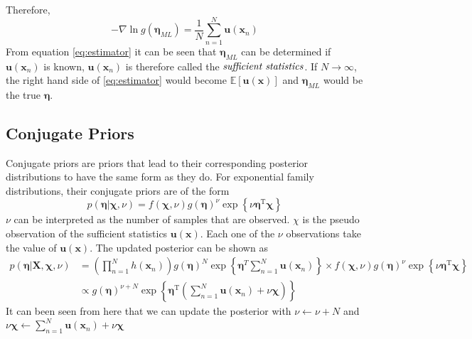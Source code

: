 \documentclass[12pt]{article}
\begin{document}
Therefore,
\begin{equation}\label{eq:estimator}
    -\nabla \ln{g(\bm{\eta}_{ML})} = \frac{1}{N}\sum_{n=1}^N\mathbf{u}(\mathbf{x}_n)
\end{equation}
From equation \ref{eq:estimator} it can be seen that $\bm{\eta}_{ML}$ can be determined if $\mathbf{u}(\mathbf{x}_n)$ is known, $\mathbf{u}(\mathbf{x}_n)$ is therefore called the $\emph{sufficient statistics}$. If $N\rightarrow \infty$, the right hand side of \ref{eq:estimator} would become $\mathbb{E}[\mathbf{u}(\mathbf{x})]$ and $\bm{\eta}_{ML}$ would be the true $\bm{\eta}$.
\subsection{Conjugate Priors}
Conjugate priors are priors that lead to their corresponding posterior distributions to have the same form as they do.
For exponential family distributions, their conjugate priors are of the form
\begin{equation}\label{eq:conjugate_prior}
    p(\boldsymbol{\eta} | \boldsymbol{\chi}, \nu)=f(\boldsymbol{\chi}, \nu) g(\boldsymbol{\eta})^{\nu} \exp \left\{\nu \boldsymbol{\eta}^{\mathrm{T}} \boldsymbol{\chi}\right\}
\end{equation}
$\nu$ can be interpreted as the number of samples that are observed. $\chi$ is the pseudo observation of the sufficient statistics $\mathbf{u}(\mathbf{x})$. Each one of the $\nu$ observations take the value of $\mathbf{u}(\mathbf{x})$.
The updated posterior can be shown as
\begin{equation}\label{eq:posterior_0}
    \begin{split}
        p(\boldsymbol{\eta} | \mathbf{X}, \boldsymbol{\chi}, \nu) &=
        \left(\prod_{n=1}^{N}h(\mathbf{x}_n)\right)g(\bm{\eta})^N\exp\left\{\bm{\eta}^T\sum_{n=1}^N\mathbf{u}(\mathbf{x}_n)\right\}\times f(\boldsymbol{\chi}, \nu) g(\boldsymbol{\eta})^{\nu} \exp \left\{\nu \boldsymbol{\eta}^{\mathrm{T}} \boldsymbol{\chi}\right\}\\
        &\propto
        g(\boldsymbol{\eta})^{\nu+N} \exp \left\{\boldsymbol{\eta}^{\mathrm{T}}\left(\sum_{n=1}^{N} \mathbf{u}\left(\mathbf{x}_{n}\right)+\nu \bm{\chi}\right)\right\}
    \end{split}
\end{equation}
It can been seen from here that we can update the posterior with $\nu \leftarrow \nu+N$ and $\nu\bm{\chi} \leftarrow \sum_{n=1}^{N} \mathbf{u}\left(\mathbf{x}_{n}\right)+\nu \bm{\chi}$
\end{document}
